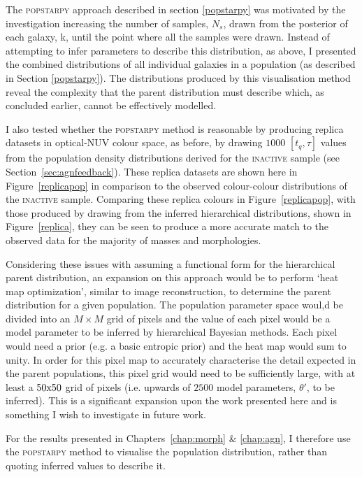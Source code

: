 The \textsc{popstarpy} approach described in section \ref{popstarpy} was motivated by the investigation increasing the number of samples, $N_s$, drawn from the posterior of each galaxy, k, until the point where all the samples were drawn. Instead of attempting to infer parameters to describe this distribution, as above, I presented the combined distributions of all individual galaxies in a population (as described in Section \ref{popstarpy}).  The distributions produced by this visualisation method reveal the complexity that the parent distribution must describe which, as concluded earlier, cannot be effectively modelled.

I also tested whether the \textsc{popstarpy} method is reasonable by producing replica datasets in optical-NUV colour space, as before, by drawing $1000$ $[t_q, \tau]$ values from the population density distributions derived for the \textsc{inactive} sample (see Section~\ref{sec:agnfeedback}). These replica datasets are shown here in Figure~\ref{replicapop} in comparison to the observed colour-colour distributions of the \textsc{inactive} sample. Comparing these replica colours in Figure~\ref{replicapop}, with those produced by drawing from the inferred hierarchical distributions, shown in Figure~\ref{replica}, they can be seen to produce a more accurate match to the observed data for the majority of masses and morphologies. 

Considering these issues with assuming a functional form for the hierarchical parent distribution, an expansion on this approach would be to perform `heat map optimization', similar to image reconstruction, to determine the parent distribution for a given population. The population parameter space woul,d be divided into an $M \times M$ grid of pixels and the value of each pixel would be a model parameter to be inferred by hierarchical Bayesian methods. Each pixel would need a prior (e.g. a basic entropic prior) and the heat map would sum to unity. In order for this pixel map to accurately characterise the detail expected in the parent populations, this pixel grid would need to be sufficiently large, with at least a $50\rm{x}50$ grid of pixels (i.e. upwards of $2500$ model parameters, $\theta'$, to be inferred). This is a significant expansion upon the work presented here and is something I wish to investigate in future work.

For the results presented in Chapters~\ref{chap:morph} \& \ref{chap:agn}, I therefore use the \textsc{popstarpy} method to visualise the population distribution, rather than quoting inferred values to describe it.


